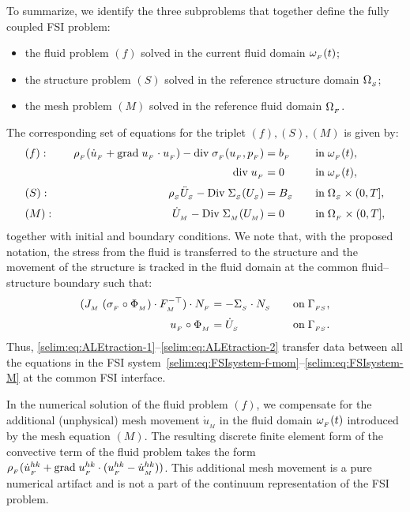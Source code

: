 To summarize, we identify the three subproblems that together define
the fully coupled FSI \nobreak problem:
\begin{itemize}
  \item the fluid problem $(f)$ solved in the current fluid domain
  $\omega_{_{F}}(t)$;

  \item the structure problem $(S)$ solved in the reference structure
  domain $\Omega_{_{S}}$;

  \item the mesh problem $(M)$ solved in the reference fluid domain $\Omega_{_{F}}$.
\end{itemize}
The corresponding set of equations for the triplet
$(f),(S),(M)$ is given by:
\begin{align}
  \label{selim:eq:FSIsystem-f-mom}
  &(f):&\quad
  \rho_{_{F}}(\dot{u}_{_{F}} + \textrm{grad}\;u_{_{F}}\cdot u_{_{F}}) - \textrm{div}\;\sigma_{_{F}}(u_{_{F}},p_{_{F}}) &= b_{_{F}}
  \quad&&\textrm{in}\;\omega_{_{F}}(t),\\[2.5pt]
  \label{selim:eq:FSIsystem-f-con}
  &&\textrm{div}\;u_{_{F}} &= 0
  \quad&&\textrm{in}\;\omega_{_{F}}(t),\\[2.5pt]
  \label{selim:eq:FSIsystem-S}
  &(S):&\quad
  \rho_{_{S}} \ddot{U}_{_{S}} - \textrm{Div}\; \Sigma_{_{S}}(U_{_{S}}) &= B_{_{S}}
  \quad&&\textrm{in}\;\Omega_{_{S}}\times(0,T],\\[2.5pt]
  \label{selim:eq:FSIsystem-M}
  &(M):&\quad  \dot{U}_{_{M}} - \textrm{Div}\; \Sigma_{_{M}}(U_{_{M}}) &= 0
  \quad&&\textrm{in}\;\Omega_{_{F}}\times(0,T],
\end{align}
together with initial and boundary conditions. We note that, with the
proposed notation, the stress from the fluid is transferred to the
structure and the movement of the structure is tracked in the fluid
domain at the common fluid--structure boundary such that:
\begin{align}
  \label{selim:eq:ALEtraction-1}
  (J_{_{M}}\;(\sigma_{_{F}}\circ\Phi_{_{M}}) \cdot F_{_{M}}^{-\top})\cdot
  N_{_{F}} &= - \Sigma_{_{S}}\cdot N_{_{S}}
  \quad &&\textrm{on}\;\Gamma_{_{FS}},\\[2.5pt]
  \label{selim:eq:ALEtraction-2}
  u_{_{F}}\circ\Phi_{_{M}} &= \dot{U}_{_{S}}
  \quad &&\textrm{on}\;\Gamma_{_{FS}}.
\end{align}
Thus, \eqref{selim:eq:ALEtraction-1}--\eqref{selim:eq:ALEtraction-2} transfer data between all the equations in the FSI system~\eqref{selim:eq:FSIsystem-f-mom}--\eqref{selim:eq:FSIsystem-M} at the common FSI interface.

In the numerical solution of the fluid problem $(f)$, we compensate
for the additional (unphysical) mesh movement $\dot{u}_{_{M}}$ in the
fluid domain $\omega_{_{F}}(t)$ introduced by the mesh equation $(M)$.  The
resulting discrete finite element form of the convective term of the
fluid problem takes the form $\rho_{_{F}}(\dot{u}_{_{F}}^{hk} +
\textrm{grad}\;u_{_{F}}^{hk}\cdot(u_{_{F}}^{hk} - \dot{u}_{_{M}}^{hk}))$. This additional mesh
movement is a pure numerical artifact and is not a part of the
continuum representation of the FSI problem.

